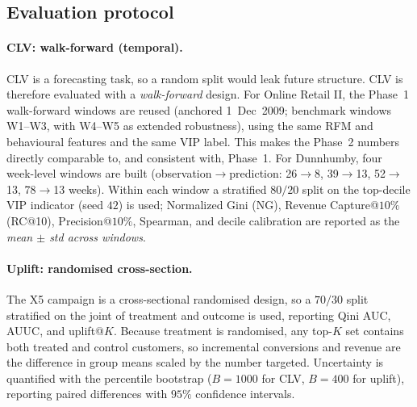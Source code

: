 \documentclass[pdflatex,sn-mathphys-num]{sn-jnl}
\theoremstyle{thmstyleone}
\theoremstyle{thmstylethree}
\begin{document}
\subsection{Evaluation protocol}\label{sec:protocol}
\paragraph{CLV: walk-forward (temporal).} CLV is a forecasting task, so a random split would leak
future structure. CLV is therefore evaluated with a \emph{walk-forward} design. For Online Retail
II, the Phase~1 walk-forward windows are reused (anchored 1~Dec~2009; benchmark windows W1--W3, with
W4--W5 as extended robustness), using the same RFM and behavioural features and the same VIP label. This makes the Phase~2 numbers directly comparable to, and consistent with, Phase~1. For Dunnhumby,
four week-level windows are built (observation$\to$prediction: 26$\to$8, 39$\to$13, 52$\to$13,
78$\to$13 weeks). Within each window a stratified $80/20$ split on the top-decile VIP indicator (seed $42$) is used;
Normalized Gini (NG), Revenue Capture@$10\%$ (RC@10), Precision@$10\%$, Spearman, and decile
calibration are reported as the \emph{mean $\pm$ std across windows}.
\paragraph{Uplift: randomised cross-section.} The X5 campaign is a cross-sectional randomised
design, so a $70/30$ split stratified on the joint of treatment and outcome is used, reporting
Qini AUC, AUUC, and uplift@$K$. Because treatment is randomised, any top-$K$ set contains both
treated and control customers, so incremental conversions and revenue are the difference in group
means scaled by the number targeted. Uncertainty is quantified with the percentile bootstrap
($B=1000$ for CLV, $B=400$ for uplift), reporting paired differences with $95\%$ confidence
intervals.
\end{document}
